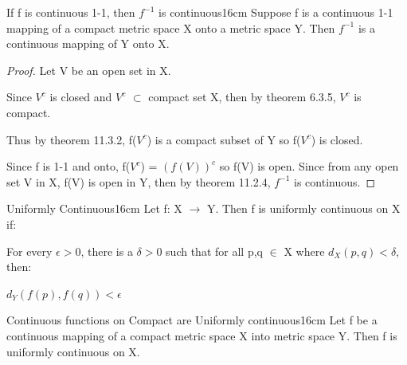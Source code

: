     \vspace{0.5cm}



    \begin{wtheorem}{If f is continuous 1-1, then $f^{-1}$ is continuous}{16cm}
        Suppose f is a continuous 1-1 mapping of a compact metric space X
        onto a metric space Y.
        Then $f^{-1}$ is a continuous mapping of Y onto X.
    \end{wtheorem}

    \begin{proof}
        Let V be an open set in X.

        Since $V^c$ is closed and $V^c$ $\subset$ compact set X,
        then by {\color{red} theorem 6.3.5}, $V^c$ is compact.

        Thus by {\color{red} theorem 11.3.2}, f($V^c$) is a compact
        subset of Y so f($V^c$) is closed.

        Since f is 1-1 and onto, f($V^c$) = $(f(V))^c$ so f(V) is open.
        Since from any open set V in X, f(V) is open in Y, then by
        {\color{red} theorem 11.2.4}, $f^{-1}$ is continuous.
    \end{proof}

    \newpage



    \begin{definition}{Uniformly Continuous}{16cm}
        Let f: X $\rightarrow$ Y. Then f is {\color{lblue} uniformly continuous}
        on X if:
        
        \begin{adjustbox}{minipage=15cm, right, vspace=0.1cm 0cm}
            For every $\epsilon > 0$, there is a $\delta > 0$
            such that for all p,q $\in$ X where $d_X(p,q) < \delta$, then:

            \hspace{0.5cm}
            $d_Y(f(p),f(q)) < \epsilon$
        \end{adjustbox}
    \end{definition}

    \vspace{0.5cm}



    \begin{wtheorem}{Continuous functions on Compact are Uniformly continuous}{16cm}
        Let f be a continuous mapping of a compact metric space X into
        metric space Y.
        Then f is uniformly continuous on X.
    \end{wtheorem}

